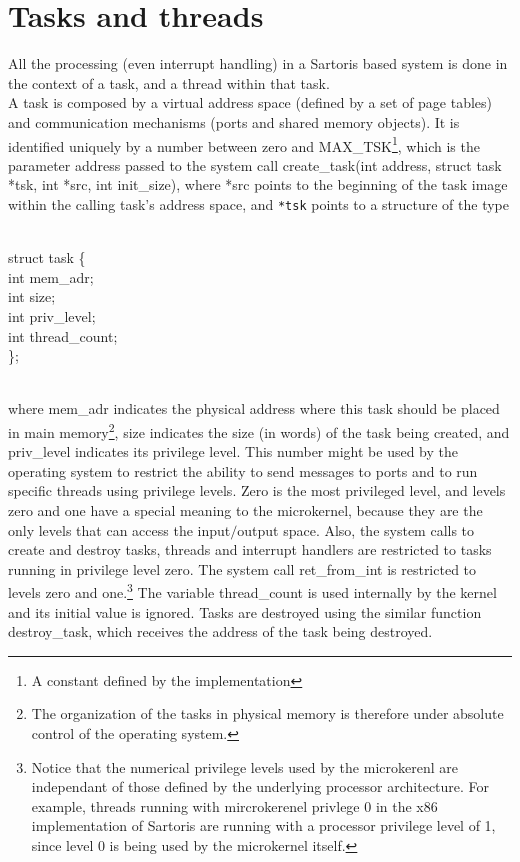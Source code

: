 \documentclass[11pt, letterpaper, twoside, english]{book}
\begin{document}
\section{Tasks and threads}
All the processing (even interrupt handling) in a Sartoris based system is done in the context of a task, and a thread within that task. \\
A task is composed by a virtual address space (defined by a set of page tables) and communication mechanisms (ports and shared memory objects). It is identified uniquely by a number between zero and \textsf{MAX\_TSK}\footnote{A constant defined by the implementation}, which is the parameter \textsf{address} passed to the system call \textsf{create\_task(int address, struct task *tsk, int *src, int init\_size)}, where \textsf{*src} points to the beginning of the task image within the calling task's address space, and \verb|*tsk| points to a structure of the type \\
\\
\begin{sf} \noindent struct task \{ \\
\indent  int mem\_adr; \\
\indent  int size; \\
\indent  int priv\_level; \\
\indent  int thread\_count; \\
\}; \\
\end{sf}
\\
\noindent where \textsf{mem\_adr} indicates the physical address where this task should be placed in main memory\footnote{The organization of the tasks in physical memory is therefore under absolute control of the operating system.}, \textsf{size} indicates the size (in words) of the task being created, and \textsf{priv\_level} indicates its privilege level. This number might be used by the operating system to restrict the ability to send messages to ports and to run specific threads using privilege levels. Zero is the most privileged level, and levels zero and one have a special meaning to the microkernel, because they are the only levels that can access the input$/$output space. Also, the system calls to create and destroy tasks, threads and interrupt handlers are restricted to tasks running in privilege level zero. The system call \textsf{ret\_from\_int} is restricted to levels zero and one.\footnote{Notice that the numerical privilege levels used by the microkerenl are independant of those defined by the underlying processor architecture. For example, threads running with mircrokerenel privlege 0 in the x86 implementation of Sartoris are running with a processor privilege level of 1, since level 0 is being used by the microkernel itself.}
The variable \textsf{thread\_count} is used internally by the kernel and its initial value is ignored.
Tasks are destroyed using the similar function \textsf{destroy\_task}, which receives the address of the task being destroyed.
\end{document}
